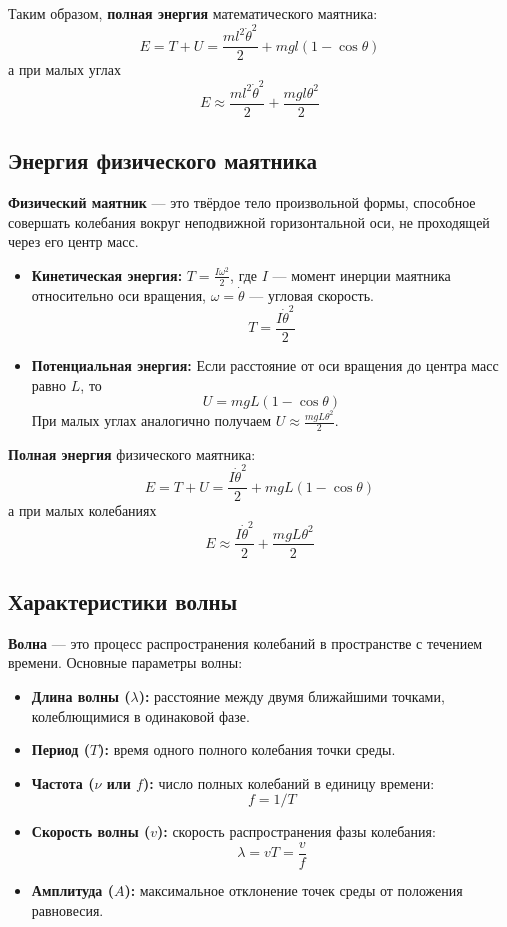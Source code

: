 Таким образом, \textbf{полная энергия} математического маятника:
\[
E = T + U = \frac{ml^2\dot{\theta}^2}{2} + mgl(1 - \cos\theta)
\]
а при малых углах
\[
\boxed{E \approx \frac{ml^2\dot{\theta}^2}{2} + \frac{mgl\theta^2}{2}}
\]

\subsection{Энергия физического маятника}
\textbf{Физический маятник} --- это твёрдое тело произвольной формы, способное совершать колебания вокруг неподвижной горизонтальной оси, не проходящей через его центр масс.

\begin{itemize}
    \item \textbf{Кинетическая энергия:} \( T = \frac{I\omega^2}{2} \), где \( I \) — момент инерции маятника относительно оси вращения, \( \omega = \dot{\theta} \) — угловая скорость.
    \[
    T = \frac{I\dot{\theta}^2}{2}
    \]
    
    \item \textbf{Потенциальная энергия:} Если расстояние от оси вращения до центра масс равно \( L \), то
    \[
    U = mgL(1 - \cos\theta)
    \]
    При малых углах аналогично получаем \( U \approx \frac{mgL\theta^2}{2} \).
\end{itemize}

\textbf{Полная энергия} физического маятника:
\[
E = T + U = \frac{I\dot{\theta}^2}{2} + mgL(1 - \cos\theta)
\]
а при малых колебаниях
\[
\boxed{E \approx \frac{I\dot{\theta}^2}{2} + \frac{mgL\theta^2}{2}}
\]

\subsection{Характеристики волны}
\textbf{Волна} --- это процесс распространения колебаний в пространстве с течением времени. Основные параметры волны:

\begin{itemize}
    \item \textbf{Длина волны ($\lambda$):} расстояние между двумя ближайшими точками, колеблющимися в одинаковой фазе. 
    \item \textbf{Период ($T$):} время одного полного колебания точки среды. 
    \item \textbf{Частота ($\nu$ или $f$):} число полных колебаний в единицу времени:
    \[
    f = 1/T
    \] 
    \item \textbf{Скорость волны ($v$):} скорость распространения фазы колебания:
    \[
    \lambda = v T = \frac{v}{f}
    \]
    \item \textbf{Амплитуда ($A$):} максимальное отклонение точек среды от положения равновесия.
\end{itemize}

